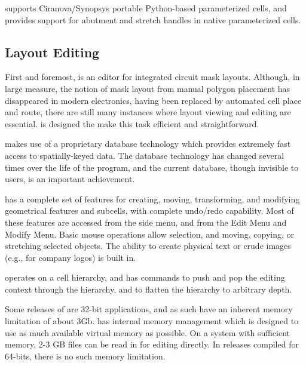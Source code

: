 {\Xic} supports Ciranova/Synopsys portable Python-based parameterized
cells, and provides support for abutment and stretch handles in native
parameterized cells.
%

\subsection{Layout Editing}

First and foremost, {\Xic} is an editor for integrated circuit mask
layouts.  Although, in large measure, the notion of mask layout from
manual polygon placement has disappeared in modern electronics, having
been replaced by automated cell place and route, there are still many
instances where layout viewing and editing are essential.  {\Xic} is
designed the make this task efficient and straightforward.

{\Xic} makes use of a proprietary database technology which provides
extremely fast access to spatially-keyed data.  The database
technology has changed several times over the life of the program, and
the current database, though invisible to users, is an important
achievement.

{\Xic} has a complete set of features for creating, moving,
transforming, and modifying geometrical features and subcells, with
complete undo/redo capability.  Most of these features are accessed
from the side menu, and from the {\cb Edit Menu} and {\cb Modify
Menu}.  Basic mouse operations allow selection, and moving, copying,
or stretching selected objects.  The ability to create physical text
or crude images (e.g., for company logos) is built in.

{\Xic} operates on a cell hierarchy, and has commands to push
and pop the editing context through the hierarchy, and to flatten
the hierarchy to arbitrary depth.

Some releases of {\Xic} are 32-bit applications, and as such have an
inherent memory limitation of about 3Gb.  {\Xic} has internal memory
management which is designed to use as much available virtual memory
as possible.  On a system with sufficient memory, 2-3 GB files can be
read in for editing directly.  In {\Xic} releases compiled for
64-bits, there is no such memory limitation.

